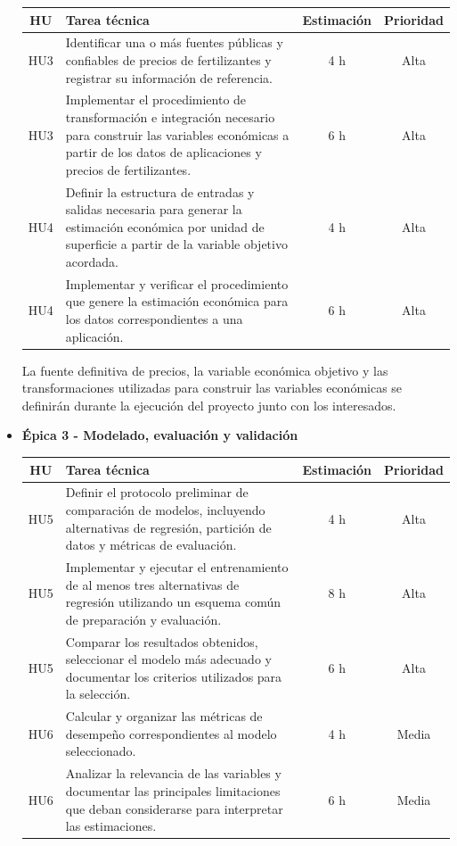\documentclass[
11pt, %
]{charter}
\begin{document}
\begin{itemize}
  \begin{center}
  \begin{tabular}{|c|p{9cm}|c|c|}
  \hline
  \textbf{HU} & \textbf{Tarea técnica} & \textbf{Estimación} & \textbf{Prioridad} \\
  \hline
  HU3 & Identificar una o más fuentes públicas y confiables de precios de fertilizantes y registrar su información de referencia. & 4 h & Alta \\
  \hline
  HU3 & Implementar el procedimiento de transformación e integración necesario para construir las variables económicas a partir de los datos de aplicaciones y precios de fertilizantes. & 6 h & Alta \\
  \hline
  HU4 & Definir la estructura de entradas y salidas necesaria para generar la estimación económica por unidad de superficie a partir de la variable objetivo acordada. & 4 h & Alta \\
  \hline
  HU4 & Implementar y verificar el procedimiento que genere la estimación económica para los datos correspondientes a una aplicación. & 6 h & Alta \\
  \hline
  \end{tabular}
  \end{center}

  La fuente definitiva de precios, la variable económica objetivo y las transformaciones utilizadas para construir las variables económicas se definirán durante la ejecución del proyecto junto con los interesados.


  \item \textbf{\'{E}pica 3 - Modelado, evaluación y validación}

  \begin{center}
  \begin{tabular}{|c|p{9cm}|c|c|}
  \hline
  \textbf{HU} & \textbf{Tarea técnica} & \textbf{Estimación} & \textbf{Prioridad} \\
  \hline
  HU5 & Definir el protocolo preliminar de comparación de modelos, incluyendo alternativas de regresión, partición de datos y métricas de evaluación. & 4 h & Alta \\
  \hline
  HU5 & Implementar y ejecutar el entrenamiento de al menos tres alternativas de regresión utilizando un esquema común de preparación y evaluación. & 8 h & Alta \\
  \hline
  HU5 & Comparar los resultados obtenidos, seleccionar el modelo más adecuado y documentar los criterios utilizados para la selección. & 6 h & Alta \\
  \hline
  HU6 & Calcular y organizar las métricas de desempeño correspondientes al modelo seleccionado. & 4 h & Media \\
  \hline
  HU6 & Analizar la relevancia de las variables y documentar las principales limitaciones que deban considerarse para interpretar las estimaciones. & 6 h & Media \\
  \hline
  \end{tabular}
  \end{center}


\end{itemize}
\end{document}
